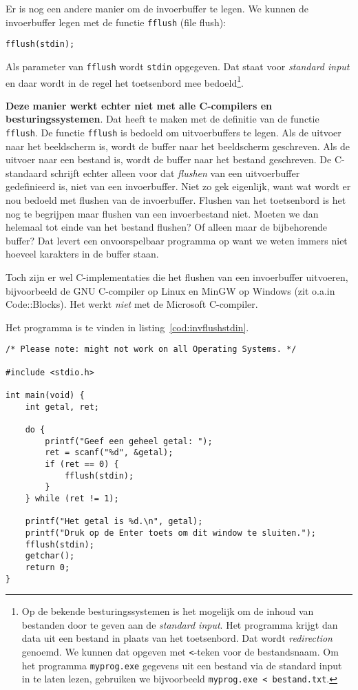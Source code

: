 Er is nog een andere manier om de invoerbuffer te legen. We kunnen de invoerbuffer legen met de functie \texttt{fflush} (file flush):

\hspace*{1em}\texttt{fflush(stdin);}

Als parameter van \texttt{fflush} wordt \texttt{stdin} opgegeven. Dat staat voor \textsl{standard input} en daar wordt in de regel het toetsenbord mee bedoeld\footnote{Op de bekende besturingssystemen is het mogelijk om de inhoud van bestanden door te geven aan de \textsl{standard input}. Het programma krijgt dan data uit een bestand in plaats van het toetsenbord. Dat wordt \textsl{redirection} genoemd. We kunnen dat opgeven met \texttt{<}-teken voor de bestandsnaam. Om het programma \texttt{myprog.exe} gegevens uit een bestand via de standard input in te laten lezen, gebruiken we bijvoorbeeld \texttt{myprog.exe < bestand.txt}.}.

\textbf{Deze manier werkt echter niet met alle C-compilers en besturingssystemen}. Dat heeft te maken met de definitie van de functie \texttt{fflush}. De functie \texttt{fflush} is bedoeld om uitvoerbuffers te legen. Als de uitvoer naar het beeldscherm is, wordt de buffer naar het beeldscherm geschreven. Als de uitvoer naar een bestand is, wordt de buffer naar het bestand geschreven. De C-standaard schrijft echter alleen voor dat \textsl{flushen} van een uitvoerbuffer gedefinieerd is, niet van een invoerbuffer. Niet zo gek eigenlijk, want wat wordt er nou bedoeld met flushen van de invoerbuffer. Flushen van het toetsenbord is het nog te begrijpen maar flushen van een invoerbestand niet. Moeten we dan helemaal tot einde van het bestand flushen? Of alleen maar de bijbehorende buffer? Dat levert een onvoorspelbaar programma op want we weten immers niet hoeveel karakters in de buffer staan.

Toch zijn er wel C-implementaties die het flushen van een invoerbuffer uitvoeren, bijvoorbeeld de GNU C-compiler op Linux en MinGW op Windows (zit o.a.\@ in Code::Blocks). Het werkt \textsl{niet} met de Microsoft C-compiler.

Het programma is te vinden in listing~\ref{cod:invflushstdin}.

\begin{lstlisting}[caption=Leegmaken van de invoerbuffer van \texttt{stdin}.,label=cod:invflushstdin]
/* Please note: might not work on all Operating Systems. */

#include <stdio.h>

int main(void) {
    int getal, ret;
    
    do {
        printf("Geef een geheel getal: ");
        ret = scanf("%d", &getal);
        if (ret == 0) {
            fflush(stdin);
        }
    } while (ret != 1);

    printf("Het getal is %d.\n", getal);
    printf("Druk op de Enter toets om dit window te sluiten.");
    fflush(stdin);
    getchar();
    return 0;
}
\end{lstlisting}




